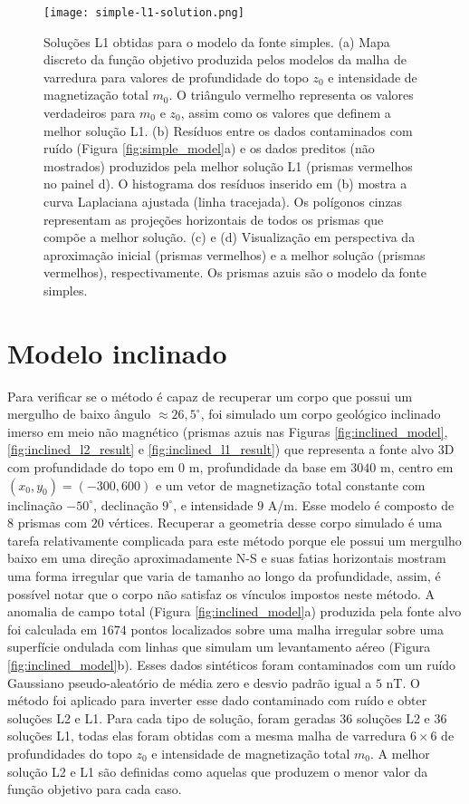 \begin{figure}[!htb]
	\centering
	\texttt{[image: simple-l1-solution.png]}
	\caption{Soluções L1 obtidas para o modelo da fonte simples. 
		(a) Mapa discreto da função objetivo produzida pelos modelos da malha de varredura para valores de profundidade do topo $z_{0}$ e intensidade de magnetização total $m_{0}$. 
		O triângulo vermelho representa os valores verdadeiros para $m_{0}$ e $z_{0}$, assim como os valores que definem a melhor solução L1.
		(b) Resíduos entre os dados contaminados com ruído (Figura \ref{fig:simple_model}a) 
		e os dados preditos (não mostrados) produzidos pela melhor solução L1 (prismas vermelhos no painel d). 
		O histograma dos resíduos inserido em (b) mostra a curva Laplaciana ajustada (linha tracejada).
		Os polígonos cinzas representam as projeções horizontais de todos os prismas que compõe a melhor solução. 
		(c) e (d) Visualização em perspectiva da aproximação inicial (prismas vermelhos) e 
		a melhor solução (prismas vermelhos), respectivamente. Os prismas azuis são o modelo da fonte simples. 
	}
	\label{fig:simple_l1_result}
\end{figure}

\pagebreak

\section{Modelo inclinado}

Para verificar se o método é capaz de recuperar um corpo que possui um mergulho de baixo ângulo $\approx 26,5^\circ $, foi simulado um corpo geológico inclinado imerso em meio não magnético (prismas azuis nas Figuras 
\ref{fig:inclined_model}, \ref{fig:inclined_l2_result} e \ref{fig:inclined_l1_result})
que representa a fonte alvo 3D com profundidade do topo em $0$ m, profundidade da base em $3040$ m, centro em $ (x_0, y_0) = (-300, 600) $ e um vetor de magnetização total constante com inclinação $-50^{\circ}$, declinação $9^{\circ}$, e intensidade $9$ A/m.
Esse modelo é composto de $ 8 $ prismas com $ 20 $ vértices.
Recuperar a geometria desse corpo simulado é uma tarefa relativamente complicada para este método porque ele possui um mergulho baixo em uma direção aproximadamente N-S e suas fatias horizontais mostram uma forma irregular que varia de tamanho ao longo da profundidade, assim, é possível notar que o corpo não satisfaz os vínculos impostos neste método.
A anomalia de campo total (Figura \ref{fig:inclined_model}a) produzida pela fonte alvo foi calculada em $1674$ pontos localizados sobre uma malha irregular sobre uma superfície ondulada com linhas que simulam um levantamento aéreo (Figura \ref{fig:inclined_model}b). Esses dados sintéticos foram contaminados com um ruído Gaussiano pseudo-aleatório de média zero e desvio padrão igual a $5$ nT.
O método foi aplicado para inverter esse dado contaminado com ruído e obter soluções L2 e L1.
Para cada tipo de solução, foram geradas $36$ soluções L2 e $36$ soluções L1, 
todas elas foram obtidas com a mesma malha de varredura $6 \times 6$ de profundidades do topo $z_{0}$ e intensidade de magnetização total $m_{0}$.
A melhor solução L2 e L1 são definidas como aquelas que produzem o menor valor da função objetivo para cada caso.

